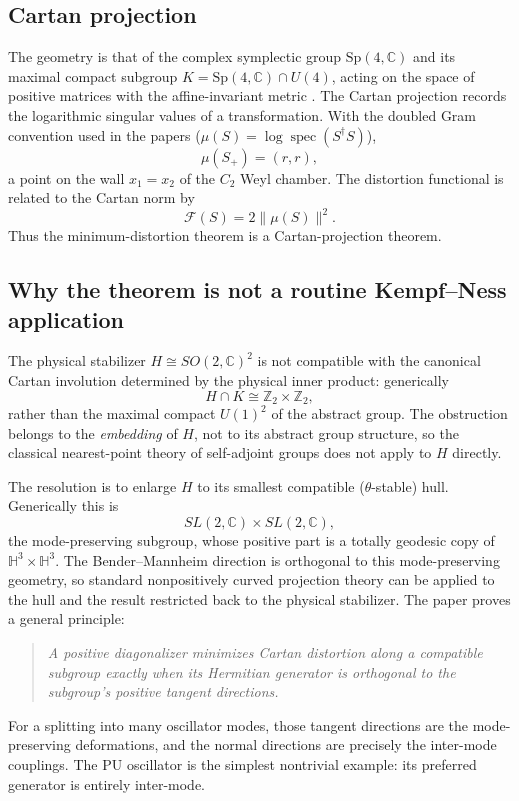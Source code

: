 \documentclass[11pt]{article}
\theoremstyle{remark}
\newcommand{\C}{\mathbb{C}}
\newcommand{\Z}{\mathbb{Z}}
\newcommand{\Sp}{\mathrm{Sp}}
\newcommand{\dg}{\dagger}
\begin{document}
\subsection{Cartan projection}

The geometry is that of the complex symplectic group $\Sp(4,\C)$ and its
maximal compact subgroup $K=\Sp(4,\C)\cap U(4)$, acting on the space of
positive matrices with the affine-invariant metric \cite{Bhatia2007}.
The Cartan projection records the logarithmic singular values of a
transformation.  With the doubled Gram convention used in the papers
($\mu(S)=\log\operatorname{spec}(S^{\dg}S)$),
\begin{equation}
\mu(S_+)=(r,r),
\end{equation}
a point on the wall $x_1=x_2$ of the $C_2$ Weyl chamber.  The distortion
functional is related to the Cartan norm by
\begin{equation}
\mathcal F(S)=2\|\mu(S)\|^2 .
\end{equation}
Thus the minimum-distortion theorem is a Cartan-projection theorem.

\subsection{Why the theorem is not a routine Kempf--Ness application}

The physical stabilizer $H\cong SO(2,\C)^2$ is not compatible with the
canonical Cartan involution determined by the physical inner product:
generically
\begin{equation}
H\cap K\cong\Z_2\times\Z_2,
\end{equation}
rather than the maximal compact $U(1)^2$ of the abstract group.  The
obstruction belongs to the \emph{embedding} of $H$, not to its abstract
group structure, so the classical nearest-point theory of self-adjoint
groups \cite{Mostow1955,KempfNess1979} does not apply to $H$ directly.

The resolution is to enlarge $H$ to its smallest compatible
($\theta$-stable) hull.  Generically this is
\begin{equation}
SL(2,\C)\times SL(2,\C),
\end{equation}
the mode-preserving subgroup, whose positive part is a totally geodesic
copy of $\mathbb H^3\times\mathbb H^3$.  The Bender--Mannheim direction
is orthogonal to this mode-preserving geometry, so standard nonpositively
curved projection theory can be applied to the hull and the result
restricted back to the physical stabilizer.  The paper proves a general
principle:
\begin{quote}
\emph{A positive diagonalizer minimizes Cartan distortion along a
compatible subgroup exactly when its Hermitian generator is orthogonal to
the subgroup's positive tangent directions.}
\end{quote}
For a splitting into many oscillator modes, those tangent directions are
the mode-preserving deformations, and the normal directions are precisely
the inter-mode couplings.  The PU oscillator is the simplest nontrivial
example: its preferred generator is entirely inter-mode.
\end{document}
